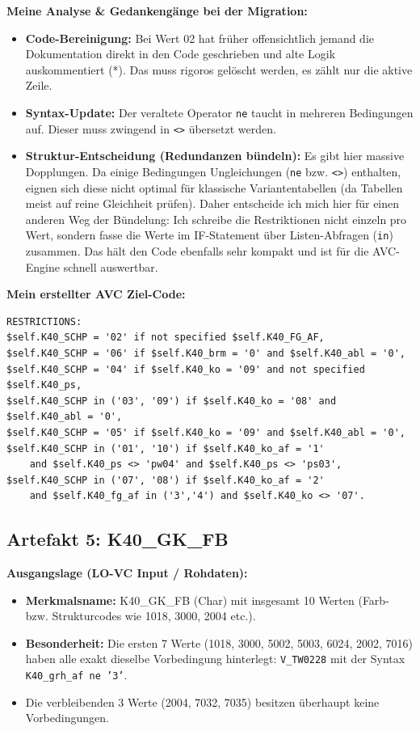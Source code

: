\documentclass[12pt, a4paper, oneside]{book}
\begin{document}
\textbf{Meine Analyse \& Gedankengänge bei der Migration:}
\begin{itemize}
    \item \textbf{Code-Bereinigung:} Bei Wert 02 hat früher offensichtlich jemand die Dokumentation direkt in den Code geschrieben und alte Logik auskommentiert (*). Das muss rigoros gelöscht werden, es zählt nur die aktive Zeile.
    \item \textbf{Syntax-Update:} Der veraltete Operator \texttt{ne} taucht in mehreren Bedingungen auf. Dieser muss zwingend in \texttt{<>} übersetzt werden.
    \item \textbf{Struktur-Entscheidung (Redundanzen bündeln):} Es gibt hier massive Dopplungen. Da einige Bedingungen Ungleichungen (\texttt{ne} bzw. \texttt{<>}) enthalten, eignen sich diese nicht optimal für klassische Variantentabellen (da Tabellen meist auf reine Gleichheit prüfen). Daher entscheide ich mich hier für einen anderen Weg der Bündelung: Ich schreibe die Restriktionen nicht einzeln pro Wert, sondern fasse die Werte im IF-Statement über Listen-Abfragen (\texttt{in}) zusammen. Das hält den Code ebenfalls sehr kompakt und ist für die AVC-Engine schnell auswertbar.
\end{itemize}

\textbf{Mein erstellter AVC Ziel-Code:}
\begin{verbatim}
RESTRICTIONS:
$self.K40_SCHP = '02' if not specified $self.K40_FG_AF,
$self.K40_SCHP = '06' if $self.K40_brm = '0' and $self.K40_abl = '0',
$self.K40_SCHP = '04' if $self.K40_ko = '09' and not specified $self.K40_ps,
$self.K40_SCHP in ('03', '09') if $self.K40_ko = '08' and $self.K40_abl = '0',
$self.K40_SCHP = '05' if $self.K40_ko = '09' and $self.K40_abl = '0',
$self.K40_SCHP in ('01', '10') if $self.K40_ko_af = '1' 
    and $self.K40_ps <> 'pw04' and $self.K40_ps <> 'ps03',
$self.K40_SCHP in ('07', '08') if $self.K40_ko_af = '2' 
    and $self.K40_fg_af in ('3','4') and $self.K40_ko <> '07'.
\end{verbatim}

\vspace{1em}

\subsection*{Artefakt 5: K40\_GK\_FB}

\textbf{Ausgangslage (LO-VC Input / Rohdaten):}
\begin{itemize}
    \item \textbf{Merkmalsname:} K40\_GK\_FB (Char) mit insgesamt 10 Werten (Farb- bzw. Strukturcodes wie 1018, 3000, 2004 etc.).
    \item \textbf{Besonderheit:} Die ersten 7 Werte (1018, 3000, 5002, 5003, 6024, 2002, 7016) haben alle exakt dieselbe Vorbedingung hinterlegt: \texttt{V\_TW0228} mit der Syntax \texttt{K40\_grh\_af ne '3'}.
    \item Die verbleibenden 3 Werte (2004, 7032, 7035) besitzen überhaupt keine Vorbedingungen.
\end{itemize}
\end{document}

